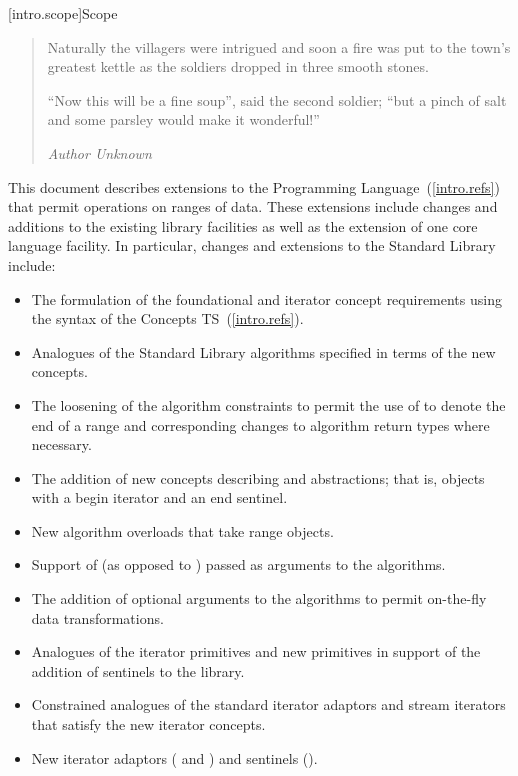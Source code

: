 [intro.scope]{Scope}

\begin{quote}
Naturally the villagers were intrigued and soon a fire was put to the town's greatest
kettle as the soldiers dropped in three smooth stones.

``Now this will be a fine soup'', said the second soldier;
``but a pinch of salt and some parsley would make it wonderful!''
\begin{flushright}
\textemdash \textit{Author Unknown}
\end{flushright}
\end{quote}

\pnum
This document describes extensions to the \Cpp
Programming Language~(\ref{intro.refs}) that
permit operations on ranges of data. These extensions include
changes and additions to the existing library facilities as well
as the extension of one core language facility. In particular,
changes and extensions to the Standard Library include:

\begin{itemize}
\item The formulation of the foundational and iterator concept requirements
using the syntax of the Concepts TS~(\ref{intro.refs}).
\item Analogues of the Standard Library algorithms specified in terms of the new
concepts.
\item The loosening of the algorithm constraints to permit the use of
 to denote the end of a range and corresponding changes to algorithm
return types where necessary.
\item The addition of new concepts describing  and 
abstractions; that is, objects with a begin iterator and an end sentinel.
\item New algorithm overloads that take range objects.
\item Support of  (as opposed to )
passed as arguments to the algorithms.
\item The addition of optional  arguments to the algorithms to
permit on-the-fly data transformations.
\item Analogues of the iterator primitives and new primitives in support of the
addition of sentinels to the library.
\item Constrained analogues of the standard iterator adaptors and stream iterators
that satisfy the new iterator concepts.
\item New iterator adaptors ( and ) and
sentinels ().
\end{itemize}

